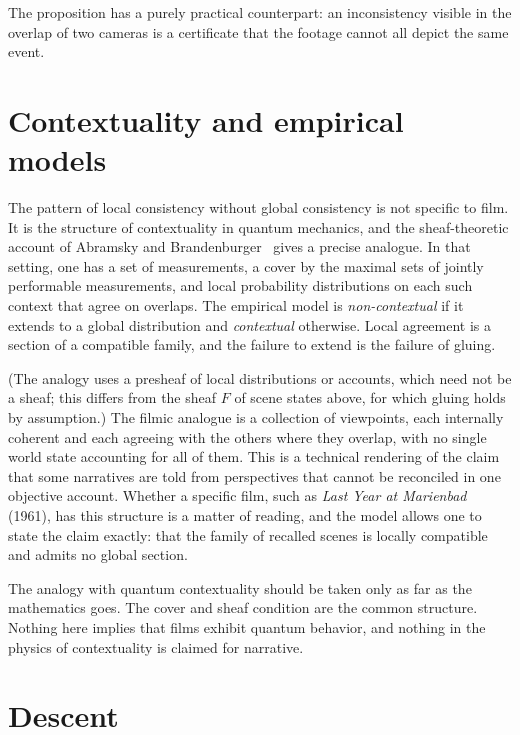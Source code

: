 The proposition has a purely practical counterpart: an inconsistency visible in the overlap of two cameras is a certificate that the footage cannot all depict the same event.

\section{Contextuality and empirical models}

The pattern of local consistency without global consistency is not specific to film. It is the structure of contextuality in quantum mechanics, and the sheaf-theoretic account of Abramsky and Brandenburger~\cite{abramsky2011} gives a precise analogue. In that setting, one has a set of measurements, a cover by the maximal sets of jointly performable measurements, and local probability distributions on each such context that agree on overlaps. The empirical model is \emph{non-contextual} if it extends to a global distribution and \emph{contextual} otherwise. Local agreement is a section of a compatible family, and the failure to extend is the failure of gluing.

(The analogy uses a presheaf of local distributions or accounts, which need not be a sheaf; this differs from the sheaf $F$ of scene states above, for which gluing holds by assumption.) The filmic analogue is a collection of viewpoints, each internally coherent and each agreeing with the others where they overlap, with no single world state accounting for all of them. This is a technical rendering of the claim that some narratives are told from perspectives that cannot be reconciled in one objective account. Whether a specific film, such as \emph{Last Year at Marienbad} (1961), has this structure is a matter of reading, and the model allows one to state the claim exactly: that the family of recalled scenes is locally compatible and admits no global section.

\begin{remark}
The analogy with quantum contextuality should be taken only as far as the mathematics goes. The cover and sheaf condition are the common structure. Nothing here implies that films exhibit quantum behavior, and nothing in the physics of contextuality is claimed for narrative.
\end{remark}

\section{Descent}

